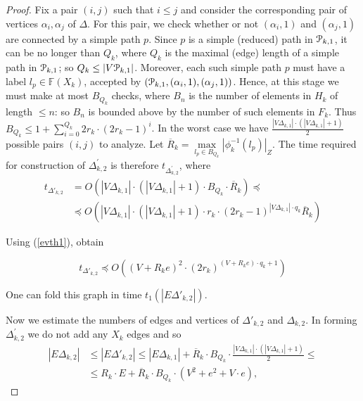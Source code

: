 \documentclass[a4paper,12pt]{article}
\renewcommand{\a}{\alpha }
\newcommand{\D}{\Delta }
\newcommand{\cP}{{\cal{P}}}
\numberwithin{equation}{section}
\numberwithin{figure}{section}
\newcommand{\FF}{\ensuremath{\mathbb{F}}}
\begin{document}
\begin{proof}
Fix a pair $(i, j)$ such that $i \le j$ and consider the
corresponding pair of vertices $\a_i,\a_j$ of $\D$. For this pair, we check
whether or not $(\a_i,1)$ and $(\a_j,1)$ are
connected by a  simple path $p$.
Since $p$ is a
simple (reduced) path in $\cP_{k,1}$, it can be no longer than $Q_k$,
where $Q_k$ is the maximal (edge) length of a simple path in $\cP_{k,1}$;
so $Q_k \le |V\cP_{k,1}|$.
Moreover, each such  simple path $p$ must have a label $l_p \in \FF(X_k)$,
accepted by $(\cP_{k,1},(\a_i,1),(\a_j,1))$. Hence, at
 this stage we must make
at most $B_{Q_k}$ checks, where $B_n$ is the number of elements in
$H_k$ of length $\le n$: so $B_{n}$ is bounded above by the number
of such elements in $F_k$. Thus $B_{Q_k} \le 1+
\mathop{\sum}\limits_{i=0}^{Q_k} 2 r_k \cdot (2r_k-1)^{i}$. In the
worst case we have $\frac{|V\D_{k,1}|\cdot(|V\D_{k,1}|+1)}{2}$ possible
pairs $(i,j)$ to analyze. Let $\overline{R}_k=\max\limits_{l_p \in
B_{Q_k}}|\phi^{-1}_k(l_p)|_Z$.
 The time required for construction of $\D_{k,2}^\prime$ is therefore $t_{\D_{k,2}^\prime}$,
where
\begin{equation}\label{pretheta'2}
\begin{split}
t_{\D'_{k,2}} &= O(|V\D_{k,1}|\cdot(|V\D_{k,1}|+1)\cdot B_{Q_k}
\cdot \overline{R}_k)\preceq\\
&\preceq O(|V\D_{k,1}|\cdot(|V\D_{k,1}|+1)\cdot r_k \cdot
(2r_k-1)^{|V\D_{k,1}|\cdot q_k}\overline{R}_k)
\end{split}
\end{equation}

Using (\ref{evth1}), obtain

\begin{equation}\label{theta'2}
t_{\D'_{k,2}} \preceq O((V + R_k e)^2\cdot (2r_k)^{(V +
R_k e)\cdot q_k +1})
\end{equation}

One can fold this graph in time $t_1(|E\D'_{k,2}|)$.

Now we estimate the numbers of edges  and vertices  of $\D'_{k,2}$ and
$\D_{k,2}$. In forming $\D_{k,2}^\prime$  we do not add any $X_k$ edges
and so
\begin{equation}\label{etheta2}
\begin{split}
|E\D_{k,2}| &\le |E\D'_{k,2}| \le |E\D_{k,1}|+\overline{R}_k\cdot B_{Q_k}
\cdot \frac{|V\D_{k,1}|\cdot(|V\D_{k,1}|+1)}{2}\le\\
&\le R_k \cdot E +
\overline{R}_k\cdot B_{Q_k} \cdot (V^2 + e^2+V\cdot e),
\end{split}
\end{equation}


\end{proof}
\end{document}
